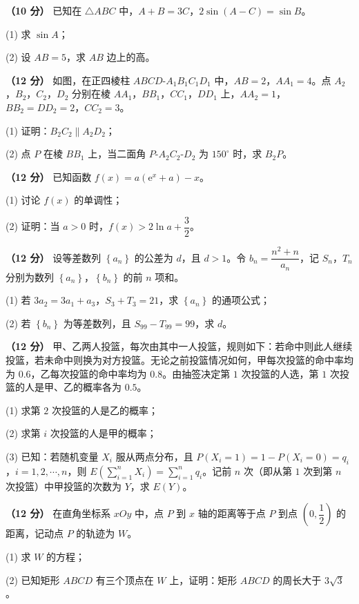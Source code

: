 \begin{question}
\textbf{（10 分）} 已知在 $\triangle ABC$ 中，$A+B=3C$，$2\sin(A-C)=\sin B$。

  (1) 求 $\sin A$；

  (2) 设 $AB=5$，求 $AB$ 边上的高。

\Needspace{0.4\textheight}
\end{question}
\begin{question}
\textbf{（12 分）} 如图，在正四棱柱 $ABCD\text{-}A_1B_1C_1D_1$ 中，$AB=2$，$AA_1=4$。点 $A_2$，$B_2$，$C_2$，$D_2$ 分别在棱 $AA_1$，$BB_1$，$CC_1$，$DD_1$ 上，$AA_2=1$，$BB_2=DD_2=2$，$CC_2=3$。
\nopagebreak[4]
\begin{center}\end{center}
\nopagebreak[4]
  (1) 证明：$B_2C_2\parallel A_2D_2$；

  (2) 点 $P$ 在棱 $BB_1$ 上，当二面角 $P\text{-}A_2C_2\text{-}D_2$ 为 $150^\circ$ 时，求 $B_2P$。

\end{question}
\begin{question}
\textbf{（12 分）} 已知函数 $f(x)=a\left(\mathrm e^{x}+a\right)-x$。

  (1) 讨论 $f(x)$ 的单调性；

  (2) 证明：当 $a>0$ 时，$f(x)>2\ln a+\dfrac32$。

\end{question}
\begin{question}
\textbf{（12 分）} 设等差数列 $\left\{a_n\right\}$ 的公差为 $d$，且 $d>1$。令 $b_n=\dfrac{n^{2}+n}{a_n}$，记 $S_n$，$T_n$ 分别为数列 $\left\{a_n\right\}$，$\left\{b_n\right\}$ 的前 $n$ 项和。

  (1) 若 $3a_2=3a_1+a_3$，$S_3+T_3=21$，求 $\left\{a_n\right\}$ 的通项公式；

  (2) 若 $\left\{b_n\right\}$ 为等差数列，且 $S_{99}-T_{99}=99$，求 $d$。

\end{question}
\begin{question}
\textbf{（12 分）} 甲、乙两人投篮，每次由其中一人投篮，规则如下：若命中则此人继续投篮，若未命中则换为对方投篮。无论之前投篮情况如何，甲每次投篮的命中率均为 $0.6$，乙每次投篮的命中率均为 $0.8$。由抽签决定第 $1$ 次投篮的人选，第 $1$ 次投篮的人是甲、乙的概率各为 $0.5$。

  (1) 求第 $2$ 次投篮的人是乙的概率；

  (2) 求第 $i$ 次投篮的人是甲的概率；

  (3) 已知：若随机变量 $X_i$ 服从两点分布，且 $P\left(X_i=1\right)=1-P\left(X_i=0\right)=q_i$，$i=1,2,\cdots,n$，则 $E\left(\displaystyle\sum_{i=1}^{n}X_i\right)=\displaystyle\sum_{i=1}^{n}q_i$。记前 $n$ 次（即从第 $1$ 次到第 $n$ 次投篮）中甲投篮的次数为 $Y$，求 $E(Y)$。

\end{question}
\begin{question}
\textbf{（12 分）} 在直角坐标系 $xOy$ 中，点 $P$ 到 $x$ 轴的距离等于点 $P$ 到点 $\left(0,\dfrac12\right)$ 的距离，记动点 $P$ 的轨迹为 $W$。

  (1) 求 $W$ 的方程；

  (2) 已知矩形 $ABCD$ 有三个顶点在 $W$ 上，证明：矩形 $ABCD$ 的周长大于 $3\sqrt3$。

\par\medskip


\end{question}